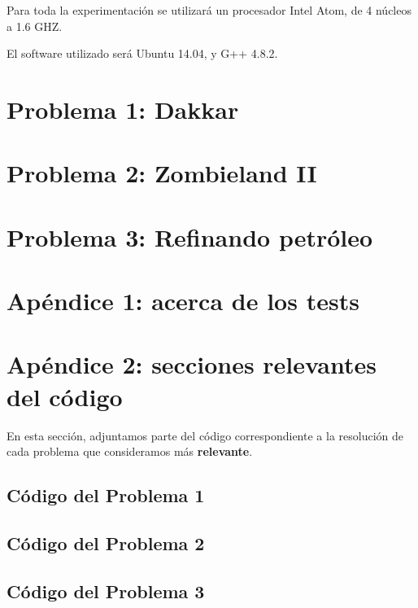 \documentclass[a4paper]{article}
\begin{document}
Para toda la experimentación se utilizará un procesador Intel Atom, de 4 núcleos a 1.6 GHZ.

El software utilizado será Ubuntu 14.04, y G++ 4.8.2.

\newpage
\section{Problema 1: Dakkar}


\newpage
\section{Problema 2: Zombieland II}


\newpage
\section{Problema 3: Refinando petróleo}



\newpage
\section{Apéndice 1: acerca de los tests}


\newpage
\section{Apéndice 2: secciones relevantes del código}
En esta sección, adjuntamos parte del código correspondiente a la resolución de cada problema que consideramos más \textbf{relevante}.

\subsection{Código del Problema 1}


\subsection{Código del Problema 2}

\subsection{Código del Problema 3}
\end{document}
